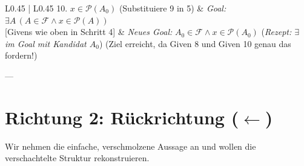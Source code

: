\documentclass{article}
\begin{document}
\begin{center}
\begin{tabular}{ L{0.45\textwidth} | L{0.45\textwidth} }
10. $x \in \mathcal{P}(A_0)$ \quad (Substituiere 9 in 5) &
\emph{Goal:} $\exists A \, (A \in \mathcal{F} \land x \in \mathcal{P}(A))$ \\[1ex]
\hline
[Givens wie oben in Schritt 4] &
\emph{Neues Goal:} $A_0 \in \mathcal{F} \land x \in \mathcal{P}(A_0)$ \newline
(\emph{Rezept: $\exists$ im Goal mit Kandidat $A_0$}) \newline
\newline
\checkmark \quad (Ziel erreicht, da Given 8 und Given 10 genau das fordern!) \\
\bottomrule
\end{tabular}
\end{center}

---

\section*{Richtung 2: Rückrichtung ($\leftarrow$)}
Wir nehmen die einfache, verschmolzene Aussage an und wollen die verschachtelte Struktur rekonstruieren.
\end{document}
